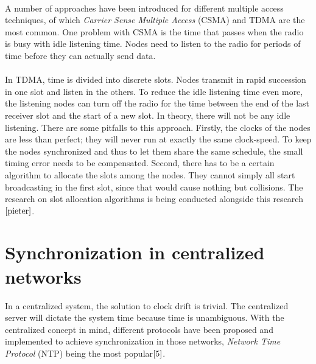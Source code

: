 \documentclass[a4paper,10pt]{report}
\begin{document}
\paragraph*{}
A number of approaches have been introduced for different multiple access techniques, of which \textit{Carrier Sense Multiple Access} (CSMA) and TDMA are the most common. One problem with CSMA is the time that passes when the radio is busy with idle listening time. Nodes need to listen to the radio for periods of time before they can actually send data.
\paragraph*{}
In TDMA, time is divided into discrete slots. Nodes transmit in rapid succession in one slot and listen in the others. To
reduce the idle listening time even more, the listening nodes can turn off the radio for the time between the end of the last receiver slot and the start of a new slot. In theory, there will not be any idle listening. There are some pitfalls to this approach. Firstly, the clocks of the nodes are less than perfect; they will never run at exactly the same clock-speed. To keep the nodes synchronized and
thus to let them share the same schedule, the small timing error needs to be compensated. Second, there has to be a certain algorithm
to allocate the slots among the nodes. They cannot simply all start broadcasting in the first slot, since that would cause nothing but
collisions. The research on slot allocation algorithms is being conducted alongside this research$\cite{pieter}$.
\section{\textbf{Synchronization in centralized networks}}
In a centralized system, the solution to clock drift is trivial. The centralized server will dictate the system time because time is unambiguous. With the centralized concept in mind, different protocols have been proposed and implemented to achieve synchronization in those networks, \textit{Network Time Protocol} (NTP) being the most popular$\cite{5}$.
\end{document}
